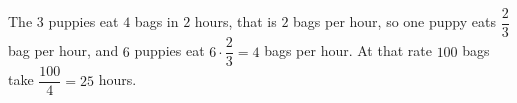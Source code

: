 The $3$ puppies eat $4$ bags in $2$ hours, that is $2$ bags per hour, so one puppy eats $\dfrac{2}{3}$ bag per hour, and $6$ puppies eat $6\cdot\dfrac{2}{3}=4$ bags per hour. At that rate $100$ bags take $\dfrac{100}{4}=\boxed{25}$ hours.

